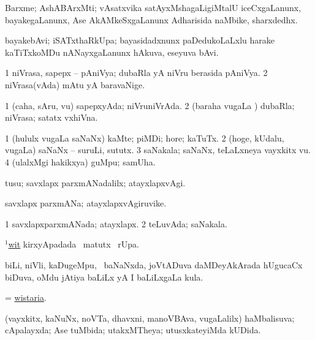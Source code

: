 \bentry
{} 
\gl{\nA}
\expl{}
\bmng
Barxme; AshABArxMti; vAsatxvika satAyxMshagaLigiMtalU iceCxgaLanunx, bayakegaLanunx, Ase AkAMkeSxgaLanunx Adharisida naMbike, sharxdedhx. 
\emng
\eentry

\bentry
{} 
\gl{\nA}
\expl{}
\bmng
bayakebAvi; iSATxthaRkUpa; bayasidadxnunx paDedukoLaLxlu harake kaTiTxkoMDu nANayxgaLanunx hAkuva, eseyuva bAvi. 
\emng
\eentry

\bentry
{} 
\gl{\nA}
\expl{}
\bmng
\bnum
\num{1} niVrasa, sapepx -- pAniVya; dubaRla yA niVru berasida pAniVya. 
\num{2} niVrasa(vAda) mAtu yA baravaNige. 
\enum
\emng
\eentry

\bentry
{} 
\gl{\gu}
\expl{}
\bmng
\bnum
\num{1} (caha, sAru, \mo vu) sapepxyAda; niVruniVrAda. 
\num{2} (baraha \mo vugaLa \vi) dubaRla; niVrasa; satatx vxhiVna. 
\enum
\emng
\eentry

\bentry
{} 
\gl{\nA}
\expl{}
\bmng
\bnum
\num{1} (hululx \mo vugaLa saNaNx) kaMte; piMDi; hore; kaTuTx. 
\num{2} (hoge, kUdalu, \mo vugaLa) saNaNx -- suruLi, sututx. 
\num{3} saNakala; saNaNx, teLaLxneya vayxkitx \mo vu. 
\num{4} (ulalxMgi hakikxya) guMpu; samUha. 
\enum
\emng
\eentry

\bentry
{} 
\gl{\kirxvi}
\expl{}
\bmng
tusu; savxlapx parxmANadalilx; atayxlapxvAgi. 
\emng
\eentry

\bentry
{} 
\gl{\nA}
\expl{}
\bmng
savxlapx parxmANa; atayxlapxvAgiruvike. 
\emng
\eentry

\bentry
{} 
\gl{\gu}
\bmng
\bnum
\num{1} savxlapxparxmANada; atayxlapx. 
\num{2} teLuvAda; saNakala. 
\enum
\emng
\eentry

\bentry
{} 
\gl{\kirx}
\expl{}
\bmng
\hyperlink{wit(1)}{$^1$wit} kirxyApadada \BU\ matutx \BUkaq\ rUpa. 
\emng
\eentry

\bentry
{} 
\gl{\nA}
\expl{}
\bmng
biLi, niVli, kaDugeMpu, \mo\ baNaNxda, joVtADuva daMDeyAkArada hUgucaCx biDuva, oMdu jAtiya baLiLx yA I baLiLxgaLa kula. 
\emng
\eentry

\bentry
{} 
\gl{\nA}
\expl{}
\bmng
= \hyperlink{wistaria}{wistaria}. 
\emng
\eentry

\bentry
{} 
\gl{\gu}
\expl{}
\bmng
(vayxkitx, kaNuNx, noVTa, dhavxni, manoVBAva, \mo vugaLalilx) haMbalisuva; cApalayxda; Ase tuMbida; utakxMTheya; utusxkateyiMda kUDida. 
\emng
\eentry

